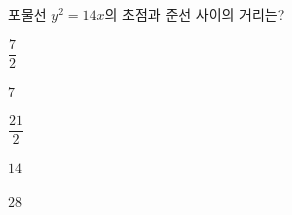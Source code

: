 포물선 $y^2=14x$의 초점과 준선 사이의 거리는?
\begin{choices32}{\rule[-3ex]{0pt}{8ex}$\dfrac{7}{2}$}{\rule[-3ex]{0pt}{8ex}$7$}{\rule[-3ex]{0pt}{8ex}$\dfrac{21}{2}$}{\rule[-3ex]{0pt}{8ex}$14$}{\rule[-3ex]{0pt}{8ex}$28$}\end{choices32}

